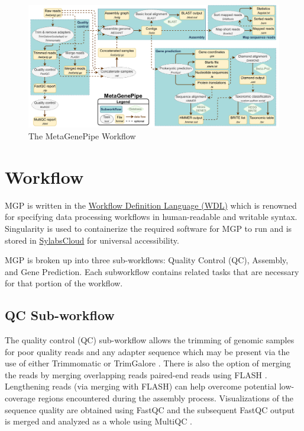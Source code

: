 \begin{figure}
\centering
\includegraphics{logo/MetaGenePipe.drawio.pdf}
\caption{The MetaGenePipe Workflow}
\end{figure}

\hypertarget{workflow}{%
\section{Workflow}\label{workflow}}

MGP is written in the \href{https://openwdl.org/}{Workflow Definition
Language (WDL)} which is renowned for specifying data processing
workflows in human-readable and writable syntax. Singularity is used to
containerize the required software for MGP to run and is stored in
\href{https://sylabs.io/}{SylabsCloud} for universal accessibility.

MGP is broken up into three sub-workflows: Quality Control (QC),
Assembly, and Gene Prediction. Each subworkflow contains related tasks
that are necessary for that portion of the workflow.

\hypertarget{qc-sub-workflow}{%
\subsection{QC Sub-workflow}\label{qc-sub-workflow}}

The quality control (QC) sub-workflow allows the trimming of genomic
samples for poor quality reads and any adapter sequence which may be
present via the use of either Trimmomatic \autocite{pmid24695404} or
TrimGalore \autocite{felix_krueger_2021_5127899}. There is also the
option of merging the reads by merging overlapping reads paired-end
reads using FLASH \autocite{Magoc2011-gb}. Lengthening reads (via
merging with FLASH) can help overcome potential low-coverage regions
encountered during the assembly process. Visualizations of the sequence
quality are obtained using FastQC \autocite{Andrews:2010tn} and the
subsequent FastQC output is merged and analyzed as a whole using MultiQC
\autocite{10.1093/bioinformatics/btw354}.

